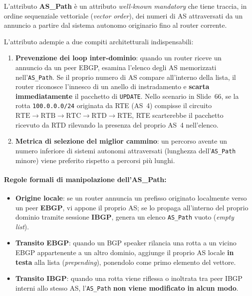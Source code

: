 \documentclass[11pt, a4paper]{article}
\begin{document}
L'attributo \textbf{AS\_Path} è un attributo \emph{well-known mandatory} che tiene traccia, in ordine sequenziale vettoriale (\emph{vector order}), dei numeri di AS attraversati da un annuncio a partire dal sistema autonomo originario fino al router corrente.


L'attributo adempie a due compiti architetturali indispensabili:
\begin{enumerate}
    \item \textbf{Prevenzione dei loop inter-dominio}: quando un router riceve un annuncio da un peer EBGP, esamina l'elenco degli AS memorizzati nell'\texttt{AS\_Path}. Se il proprio numero di AS compare all'interno della lista, il router riconosce l'innesco di un anello di instradamento e \textbf{scarta immediatamente} il pacchetto di \texttt{UPDATE}. Nello scenario in Slide~66, se la rotta \texttt{100.0.0.0/24} originata da RTE (AS~4) compisse il circuito $\text{RTE} \to \text{RTB} \to \text{RTC} \to \text{RTD} \to \text{RTE}$, RTE scarterebbe il pacchetto ricevuto da RTD rilevando la presenza del proprio AS~4 nell'elenco.
    \item \textbf{Metrica di selezione del miglior cammino}: un percorso avente un numero inferiore di sistemi autonomi attraversati (lunghezza dell'\texttt{AS\_Path} minore) viene preferito rispetto a percorsi più lunghi.
\end{enumerate}


\paragraph{Regole formali di manipolazione dell'AS\_Path:}
\begin{itemize}
    \item \textbf{Origine locale}: se un router annuncia un prefisso originato localmente verso un peer \textbf{EBGP}, vi appone il proprio AS; se lo propaga all'interno del proprio dominio tramite sessione \textbf{IBGP}, genera un elenco \texttt{AS\_Path} vuoto (\emph{empty list}).
    \item \textbf{Transito EBGP}: quando un BGP speaker rilancia una rotta a un vicino EBGP appartenente a un altro dominio, aggiunge il proprio AS locale \textbf{in testa} alla lista (\emph{prepending}), ponendolo come primo elemento del vettore.
    \item \textbf{Transito IBGP}: quando una rotta viene riflessa o inoltrata tra peer IBGP interni allo stesso AS, l'\texttt{AS\_Path} \textbf{non viene modificato in alcun modo}.
\end{itemize}
\end{document}
